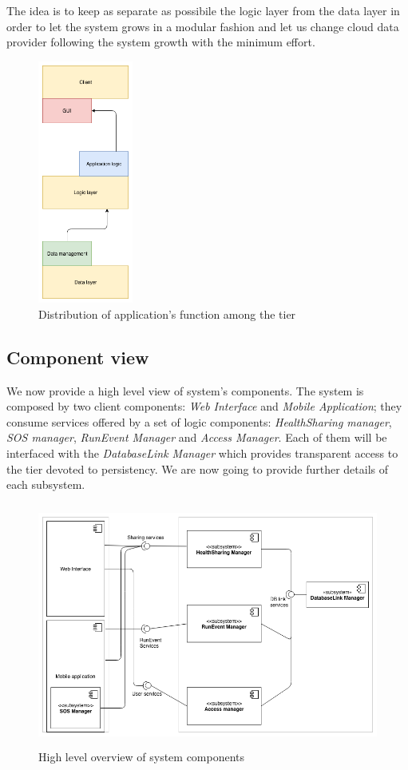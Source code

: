 \documentclass[DD.tex]{subfiles}
\begin{document}
The idea is to keep as separate as possibile the logic layer from the data layer in order to let the system grows in a modular fashion and let us change cloud data provider following the system growth with the minimum effort.

\newpage
\begin{figure}[h!]
	\centering
	\includegraphics[height=8.00cm,keepaspectratio]{Figures/ThreeTierSchema}
	\caption{Distribution of application's function among the tier}
\end{figure}
\newpage

\subsection{Component view}
We now provide a high level view of system's components. The system is composed by two client components: \textit{Web Interface} and \textit{Mobile Application}; they consume services offered by a set of logic components: \textit{HealthSharing manager}, \textit{SOS manager}, \textit{RunEvent Manager} and \textit{Access Manager}. Each of them will be interfaced with the \textit{DatabaseLink Manager} which provides transparent access to the tier devoted to persistency. \newline We are now going to provide further details of each subsystem.

\begin{figure}[h!]
	\centering
	\includegraphics[height=8.00cm,keepaspectratio]{Figures/ComponentOverview}
	\caption{High level overview of system components}
\end{figure}
\end{document}
